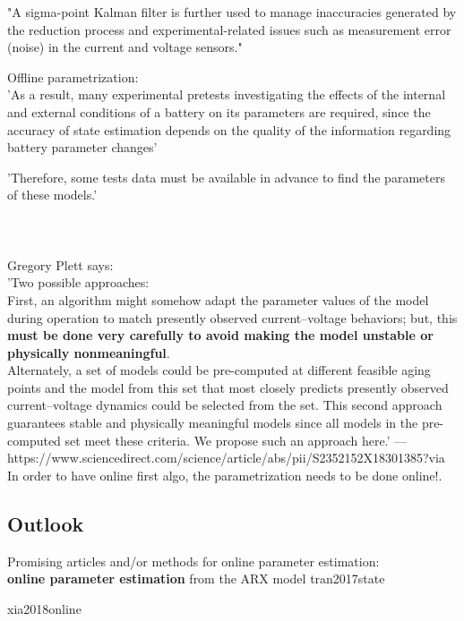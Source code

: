 "A sigma-point Kalman filter is further used to manage inaccuracies generated by the reduction process and experimental-related issues such as measurement error (noise) in the current and voltage sensors."


Offline parametrization: \\
'As a result, many experimental pretests investigating the
effects of the internal and external conditions of a battery on its parameters are required, since the
accuracy of state estimation depends on the quality of the information regarding battery parameter
changes'

'Therefore, some tests data must be available in 
advance to find the parameters of these models.'
\cite{hussein2011overview}  \\ \\ \\ \\

Gregory Plett says: \\
'Two possible approaches: \\

First, an algorithm might somehow adapt the parameter values of the model during operation to match presently observed current–voltage behaviors; but, this \textbf{must be done very carefully to avoid making the model unstable or physically nonmeaningful}. \\

Alternately, a set of models could be pre-computed at different feasible aging points and the model from this set that most closely predicts presently observed current–voltage dynamics could be selected from the set. This second approach guarantees stable and physically meaningful models since all models in the pre-computed set meet these criteria. We propose such an approach here.' 
---https://www.sciencedirect.com/science/article/abs/pii/S2352152X18301385?via%
In order to have online first algo, the parametrization needs to be done online!. 



\subsection{Outlook} 

Promising articles and/or methods for online parameter estimation: \\ 

\textbf{online parameter estimation} from the ARX model {tran2017state}

\cite{wang2021augmented}
{xia2018online}
